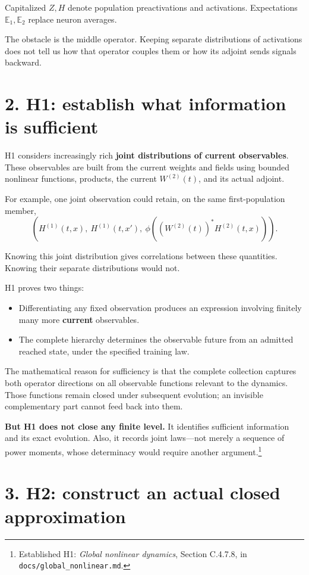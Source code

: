 \documentclass[11pt,a4paper]{scrartcl}
\begin{document}
Capitalized \(Z,H\) denote population preactivations and activations. Expectations \(\mathbb E_1,\mathbb E_2\) replace neuron averages.

The obstacle is the middle operator. Keeping separate distributions of activations does not tell us how that operator couples them or how its adjoint sends signals backward.

\section{2. H1: establish what information is sufficient}

H1 considers increasingly rich \textbf{joint distributions of current observables}. These observables are built from the current weights and fields using bounded nonlinear functions, products, the current \(W^{(2)}(t)\), and its actual adjoint.

For example, one joint observation could retain, on the same first-population member,
\[
\left(
H^{(1)}(t,x),\
H^{(1)}(t,x'),\
\phi\!\left((W^{(2)}(t))^*H^{(2)}(t,x)\right)
\right).
\]

Knowing this joint distribution gives correlations between these quantities. Knowing their separate distributions would not.

H1 proves two things:
\begin{itemize}
\item Differentiating any fixed observation produces an expression involving finitely many more \textbf{current} observables.
\item The complete hierarchy determines the observable future from an admitted reached state, under the specified training law.
\end{itemize}

The mathematical reason for sufficiency is that the complete collection captures both operator directions on all observable functions relevant to the dynamics. Those functions remain closed under subsequent evolution; an invisible complementary part cannot feed back into them.

\textbf{But H1 does not close any finite level.} It identifies sufficient information and its exact evolution. Also, it records joint laws—not merely a sequence of power moments, whose determinacy would require another argument.\footnote{Established H1: \textit{Global nonlinear dynamics}, Section C.4.7.8, in \texttt{docs/global\_nonlinear.md}.}

\section{3. H2: construct an actual closed approximation}
\end{document}
